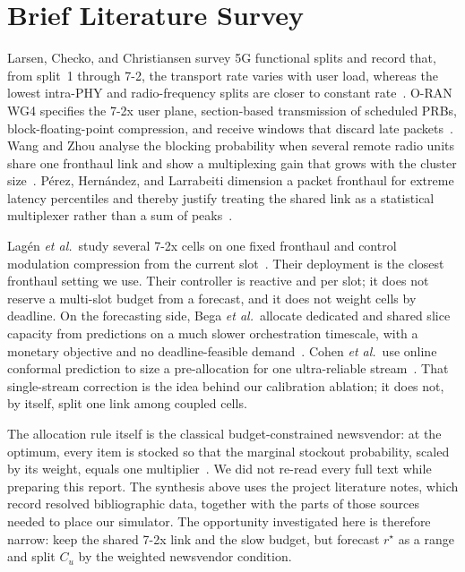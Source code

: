 \documentclass[11pt,a4paper]{article}
\begin{document}
\section{Brief Literature Survey}

Larsen, Checko, and Christiansen survey 5G functional splits and record that, from split~1 through 7-2, the transport rate varies with user load, whereas the lowest intra-PHY and radio-frequency splits are closer to constant rate~\cite{larsen2019}. O-RAN WG4 specifies the 7-2x user plane, section-based transmission of scheduled PRBs, block-floating-point compression, and receive windows that discard late packets~\cite{oran-cus}. Wang and Zhou analyse the blocking probability when several remote radio units share one fronthaul link and show a multiplexing gain that grows with the cluster size~\cite{wang2017}. P\'erez, Hern\'andez, and Larrabeiti dimension a packet fronthaul for extreme latency percentiles and thereby justify treating the shared link as a statistical multiplexer rather than a sum of peaks~\cite{perez2018}.

Lag\'en \emph{et al.}\ study several 7-2x cells on one fixed fronthaul and control modulation compression from the current slot~\cite{lagen2022}. Their deployment is the closest fronthaul setting we use. Their controller is reactive and per slot; it does not reserve a multi-slot budget from a forecast, and it does not weight cells by deadline. On the forecasting side, Bega \emph{et al.}\ allocate dedicated and shared slice capacity from predictions on a much slower orchestration timescale, with a monetary objective and no deadline-feasible demand~\cite{bega2020}. Cohen \emph{et al.}\ use online conformal prediction to size a pre-allocation for one ultra-reliable stream~\cite{cohen2023}. That single-stream correction is the idea behind our calibration ablation; it does not, by itself, split one link among coupled cells.

The allocation rule itself is the classical budget-constrained newsvendor: at the optimum, every item is stocked so that the marginal stockout probability, scaled by its weight, equals one multiplier~\cite{hadley1963}. We did not re-read every full text while preparing this report. The synthesis above uses the project literature notes, which record resolved bibliographic data, together with the parts of those sources needed to place our simulator. The opportunity investigated here is therefore narrow: keep the shared 7-2x link and the slow budget, but forecast \(r^{\star}\) as a range and split \(C_u\) by the weighted newsvendor condition.
\end{document}
